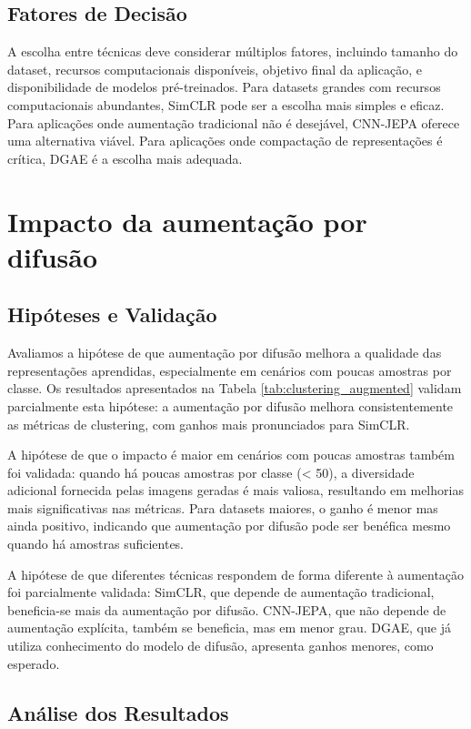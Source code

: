 \subsection{Fatores de Decisão}

A escolha entre técnicas deve considerar múltiplos fatores, incluindo tamanho do dataset, recursos computacionais disponíveis, objetivo final da aplicação, e disponibilidade de modelos pré-treinados. Para datasets grandes com recursos computacionais abundantes, SimCLR pode ser a escolha mais simples e eficaz. Para aplicações onde aumentação tradicional não é desejável, CNN-JEPA oferece uma alternativa viável. Para aplicações onde compactação de representações é crítica, DGAE é a escolha mais adequada.

\section{Impacto da aumentação por difusão}

\subsection{Hipóteses e Validação}

Avaliamos a hipótese de que aumentação por difusão melhora a qualidade das representações aprendidas, especialmente em cenários com poucas amostras por classe. Os resultados apresentados na Tabela \ref{tab:clustering_augmented} validam parcialmente esta hipótese: a aumentação por difusão melhora consistentemente as métricas de clustering, com ganhos mais pronunciados para SimCLR.

A hipótese de que o impacto é maior em cenários com poucas amostras também foi validada: quando há poucas amostras por classe (< 50), a diversidade adicional fornecida pelas imagens geradas é mais valiosa, resultando em melhorias mais significativas nas métricas. Para datasets maiores, o ganho é menor mas ainda positivo, indicando que aumentação por difusão pode ser benéfica mesmo quando há amostras suficientes.

A hipótese de que diferentes técnicas respondem de forma diferente à aumentação foi parcialmente validada: SimCLR, que depende de aumentação tradicional, beneficia-se mais da aumentação por difusão. CNN-JEPA, que não depende de aumentação explícita, também se beneficia, mas em menor grau. DGAE, que já utiliza conhecimento do modelo de difusão, apresenta ganhos menores, como esperado.

\subsection{Análise dos Resultados}


